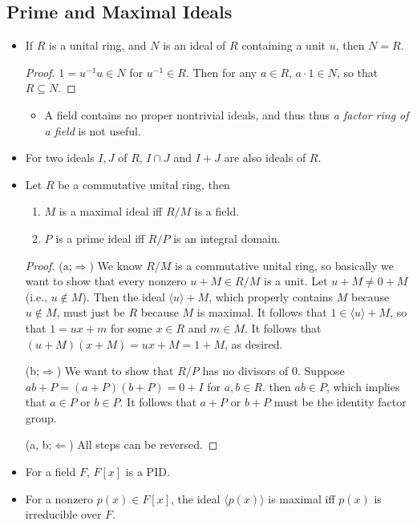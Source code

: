 \documentclass[11pt]{article}
\newcommand{\gen}[1]{\langle #1 \rangle}
\renewcommand{\implies}{\Rightarrow}
\renewcommand{\impliedby}{\Leftarrow}
\begin{document}
\subsection{Prime and Maximal Ideals}
\begin{itemize}
    \item If $R$ is a unital ring, and $N$ is an ideal of $R$ containing a unit $u$, then $N = R$.
    \begin{proof}
        $1 = u^{-1} u \in N$ for $u^{-1} \in R$. Then for any $a \in R$, $a \cdot 1 \in N$, so that $R \subseteq N$.
    \end{proof}
    \begin{itemize}
        \item A field contains no proper nontrivial ideals, and thus thus \emph{a factor ring of a field} is not useful.
    \end{itemize}
    \item For two ideals $I,J$ of $R$, $I \cap J$ and $I + J$ are also ideals of $R$.
    \item Let $R$ be a commutative unital ring, then
    \begin{enumerate}[label=(\alph*)]
        \item  $M$ is a maximal ideal iff $R/M$ is a field.
        \item $P$ is a prime ideal iff $R/P$ is an integral domain.
    \end{enumerate}
    \begin{proof}
        (a;$\implies$) We know $R/M$ is a commutative unital ring, so basically we want to show that every nonzero $u+M \in R/M$ is a unit. Let $u+M \neq 0+M$ (i.e., $u \notin M$). Then the ideal $\gen{u} + M$, which properly contains $M$ because $u \notin M$, must just be $R$ because $M$ is maximal. It follows that $1 \in \gen{u} + M$, so that $1 = ux + m$ for some $x \in R$ and $m \in M$. It follows that $(u+M)(x+M) = ux + M = 1 + M$, as desired.
        
        (b;$\implies$) We want to show that $R/P$ has no divisors of 0. Suppose $ab + P = (a+P)(b+P) = 0+I$ for $a,b \in R$. then $ab \in P$, which implies that $a \in P$ or $b \in P$. It follows that $a+P$ or $b+P$ must be the identity factor group.
        
        (a, b;$\impliedby$) All steps can be reversed.
    \end{proof}
    \item For a field $F$, $F[x]$ is a PID.
    \item For a nonzero $p(x) \in F[x]$, the ideal $\gen{p(x)}$ is maximal iff $p(x)$ is irreducible over $F$.
\end{itemize}
\end{document}
